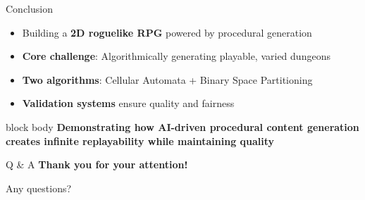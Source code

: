 \documentclass{beamer}
\begin{document}
\begin{frame}{Conclusion}
    \begin{itemize}
        \item Building a \textbf{2D roguelike RPG} powered by procedural generation
        \item \textbf{Core challenge}: Algorithmically generating playable, varied dungeons
        \item \textbf{Two algorithms}: Cellular Automata + Binary Space Partitioning
        \item \textbf{Validation systems} ensure quality and fairness
    \end{itemize}

    \vspace{0.3cm}

    \begin{beamercolorbox}[rounded=true,shadow=true,wd=\textwidth,center]{block body}
        \textbf{Demonstrating how AI-driven procedural content generation\\
        creates infinite replayability while maintaining quality}
    \end{beamercolorbox}
\end{frame}

\begin{frame}{Q \& A}
    \centering
    \Large{\textbf{Thank you for your attention!}}

    \vspace{0.5cm}
    \Large{Any questions?}
\end{frame}
\end{document}
